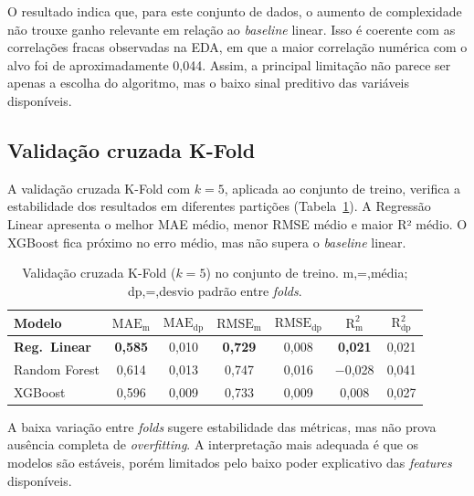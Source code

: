 \documentclass[conference]{IEEEtran}
\newcommand{\fonte}[1][elaborado pelos autores.]{%
\par\vspace{1pt}{\footnotesize\centering Fonte: #1\par}}
\begin{document}
O resultado indica que, para este conjunto de dados, o aumento de
complexidade não trouxe ganho relevante em relação ao \textit{baseline}
linear. Isso é coerente com as correlações fracas observadas na EDA, em que
a maior correlação numérica com o alvo foi de aproximadamente 0,044. Assim,
a principal limitação não parece ser apenas a escolha do algoritmo, mas o
baixo sinal preditivo das variáveis disponíveis.

\subsection{Validação cruzada K-Fold}

A validação cruzada K-Fold com $k=5$, aplicada ao conjunto de treino,
verifica a estabilidade dos resultados em diferentes partições
(Tabela~\ref{tab:cv}). A Regressão Linear apresenta o melhor MAE médio,
menor RMSE médio e maior R² médio. O XGBoost fica próximo no erro médio,
mas não supera o \textit{baseline} linear.

\begin{table}[!t]
\centering
\small
\setlength{\tabcolsep}{4pt}
\caption{Validação cruzada K-Fold ($k=5$) no conjunto de treino.
m,=,média; dp,=,desvio padrão entre \textit{folds}.}
\label{tab:cv}
\begin{tabular}{lcccccc}
\toprule
\textbf{Modelo}
& $\text{MAE}_{\text{m}}$   & $\text{MAE}_{\text{dp}}$
& $\text{RMSE}_{\text{m}}$  & $\text{RMSE}_{\text{dp}}$
& $\text{R}^{2}_{\text{m}}$ & $\text{R}^{2}_{\text{dp}}$                                                   \\
\midrule
\textbf{Reg.\ Linear}
& \textbf{0,585}          & 0,010
& \textbf{0,729}          & 0,008
& \textbf{0,021}          & 0,021 \\
Random Forest    & 0,614                   & 0,013                    & 0,747          & 0,016 & $-$0,028       & 0,041 \\
XGBoost          & 0,596                   & 0,009                    & 0,733          & 0,009 & 0,008          & 0,027 \\
\bottomrule
\end{tabular}
\fonte
\end{table}

A baixa variação entre \textit{folds} sugere estabilidade das métricas, mas
não prova ausência completa de \textit{overfitting}. A interpretação mais
adequada é que os modelos são estáveis, porém limitados pelo baixo poder
explicativo das \textit{features} disponíveis.
\end{document}
